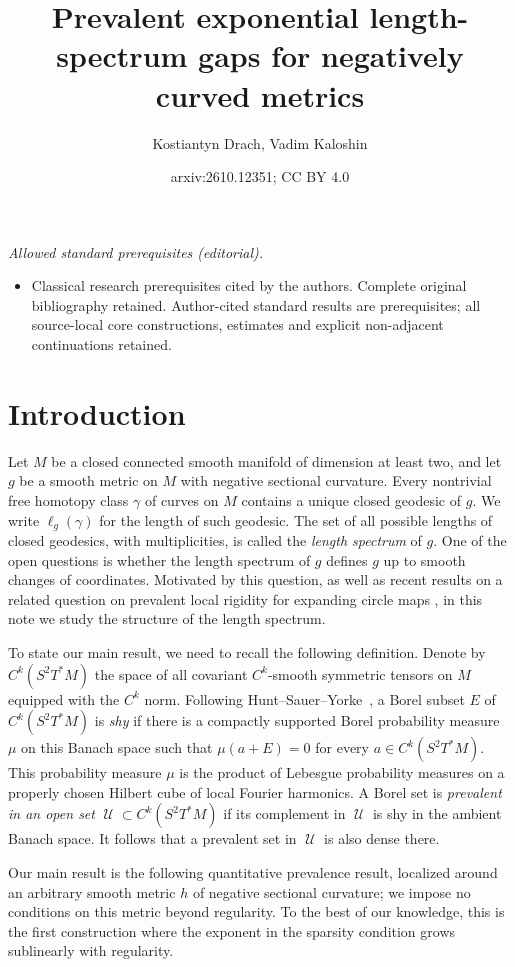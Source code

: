 \documentclass[10pt,oneside,reqno]{amsproc}
\date{}
\title{Prevalent exponential length-spectrum gaps for negatively curved metrics}
\author{Kostiantyn Drach, Vadim Kaloshin}
\date{arxiv:2610.12351; CC BY 4.0}
\numberwithin{equation}{section}
\theoremstyle{definition}
\theoremstyle{remark}
\DeclareMathOperator{\cU}{{\mathscr U}}
\begin{document}
\maketitle
\noindent\textit{Allowed standard prerequisites (editorial).}\begin{itemize}
\item Classical research prerequisites cited by the authors. Complete original bibliography retained. Author-cited standard results are prerequisites; all source-local core constructions, estimates and explicit non-adjacent continuations retained.
\end{itemize}\medskip
\section{Introduction}
Let $M$ be a closed connected smooth manifold of dimension at least two, and let $g$ be a smooth metric on $M$ with negative sectional curvature. Every nontrivial free homotopy class $\gamma$ of curves on $M$ contains a unique closed geodesic of $g$. We write $\ell_g(\gamma)$ for the length of such geodesic. The set of all possible lengths of closed geodesics, with multiplicities, is called the \emph{length spectrum} of $g$. One of the open questions is whether the length spectrum of $g$ defines $g$ up to smooth changes of coordinates. Motivated by this question, as well as recent results on a related question on prevalent local rigidity for expanding circle maps \cite{DK}, in this note we study the structure of the length spectrum.

To state our main result, we need to recall the following definition. Denote by $C^k(S^2T^*M)$ the space of all covariant $C^k$-smooth symmetric tensors on $M$ equipped with the $C^k$ norm. Following Hunt--Sauer--Yorke~\cite{HSY}, a Borel subset $E$ of $C^k(S^2T^*M)$ is \emph{shy} if there is a compactly supported Borel probability measure $\mu$ on this Banach space such that $\mu(a+E)=0$ for every $a\in C^k(S^2T^*M)$. This probability measure $\mu$ is the product of Lebesgue probability measures on a properly chosen Hilbert cube of local Fourier harmonics. A Borel set is \emph{prevalent in an open set} $\cU \subset C^k(S^2T^*M)$ if its complement in $\cU$ is shy in the ambient Banach space. It follows that a prevalent set in $\cU$ is also dense there.

Our main result is the following quantitative prevalence result, localized around an arbitrary smooth metric $h$ of negative sectional curvature; we impose no conditions on this metric beyond regularity. To the best of our knowledge, this is the first construction where the exponent in the sparsity condition grows sublinearly with regularity. 
\end{document}
